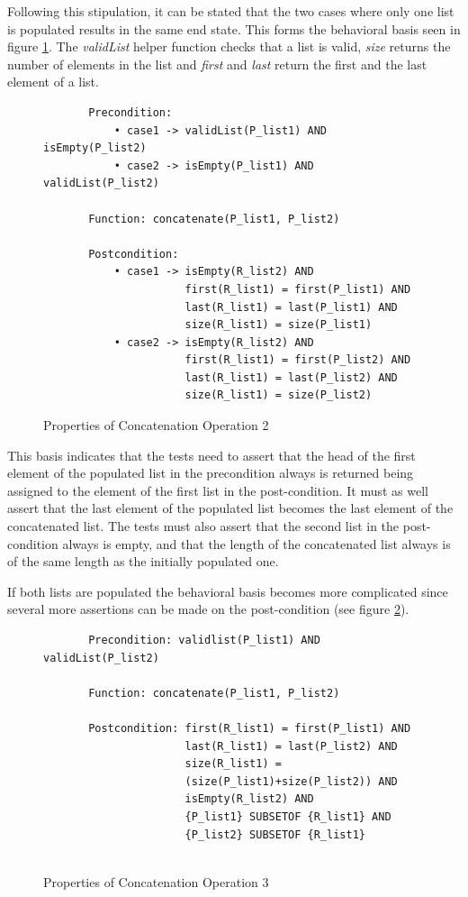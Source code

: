 Following this stipulation, it can be stated that the two cases where only one list is populated results in the same end state. This forms the behavioral basis seen in figure \ref{fig:prop2}. The \textit{validList} helper function checks that a list is valid, \textit{size} returns the number of elements in the list and \textit{first} and \textit{last} return the first and the last element of a list.

\begin{figure}[H]
\begin{verbatim}
       Precondition: 
           • case1 -> validList(P_list1) AND isEmpty(P_list2)
           • case2 -> isEmpty(P_list1) AND validList(P_list2)
        
       Function: concatenate(P_list1, P_list2)
    
       Postcondition:
           • case1 -> isEmpty(R_list2) AND
                      first(R_list1) = first(P_list1) AND
                      last(R_list1) = last(P_list1) AND 
                      size(R_list1) = size(P_list1)
           • case2 -> isEmpty(R_list2) AND
                      first(R_list1) = first(P_list2) AND
                      last(R_list1) = last(P_list2) AND
                      size(R_list1) = size(P_list2)
\end{verbatim}
    \caption{Properties of Concatenation Operation 2}
    \label{fig:prop2}
\end{figure}


This basis indicates that the tests need to assert that the head of the first element of the populated list in the precondition always is returned being assigned to the element of the first list in the post-condition. It must as well assert that the last element of the populated list becomes the last element of the concatenated list. The tests must also assert that the second list in the post-condition always is empty, and that the length of the concatenated list always is of the same length as the initially populated one. 

If both lists are populated the behavioral basis becomes more complicated since several more assertions can be made on the post-condition (see figure \ref{fig:prop3}). 
\begin{figure}[H]
\begin{nonbreaking}
\begin{verbatim}
       Precondition: validlist(P_list1) AND validList(P_list2)
    
       Function: concatenate(P_list1, P_list2)
    
       Postcondition: first(R_list1) = first(P_list1) AND
                      last(R_list1) = last(P_list2) AND
                      size(R_list1) = 
                      (size(P_list1)+size(P_list2)) AND
                      isEmpty(R_list2) AND
                      {P_list1} SUBSETOF {R_list1} AND 
                      {P_list2} SUBSETOF {R_list1}
     
\end{verbatim}
\end{nonbreaking}
    \caption{Properties of Concatenation Operation 3}
    \label{fig:prop3}
\end{figure}


